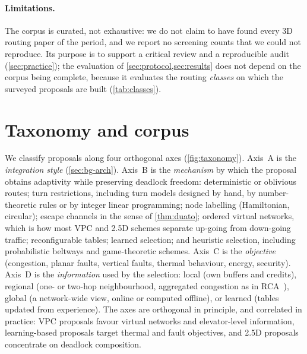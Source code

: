 \paragraph{Limitations.} The corpus is curated, not exhaustive: we do not claim to have found every 3D routing paper of the period, and we report no screening counts that we could not reproduce. Its purpose is to support a critical review and a reproducible audit (\cref{sec:practice}); the evaluation of \cref{sec:protocol,sec:results} does not depend on the corpus being complete, because it evaluates the routing \emph{classes} on which the surveyed proposals are built (\cref{tab:classes}).

\section{Taxonomy and corpus}
\label{sec:taxonomy}

We classify proposals along four orthogonal axes (\cref{fig:taxonomy}). Axis~A is the \emph{integration style} (\cref{sec:bg-arch}). Axis~B is the \emph{mechanism} by which the proposal obtains adaptivity while preserving deadlock freedom: deterministic or oblivious routes; turn restrictions, including turn models designed by hand, by number-theoretic rules or by integer linear programming; node labelling (Hamiltonian, circular); escape channels in the sense of \cref{thm:duato}; ordered virtual networks, which is how most VPC and 2.5D schemes separate up-going from down-going traffic; reconfigurable tables; learned selection; and heuristic selection, including probabilistic beltways and game-theoretic schemes. Axis~C is the \emph{objective} (congestion, planar faults, vertical faults, thermal behaviour, energy, security). Axis~D is the \emph{information} used by the selection: local (own buffers and credits), regional (one- or two-hop neighbourhood, aggregated congestion as in RCA~\cite{gratz2008rca}), global (a network-wide view, online or computed offline), or learned (tables updated from experience). The axes are orthogonal in principle, and correlated in practice: VPC proposals favour virtual networks and elevator-level information, learning-based proposals target thermal and fault objectives, and 2.5D proposals concentrate on deadlock composition.

